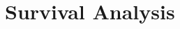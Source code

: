 \documentclass[8pt]{extarticle}
\begin{document}












\section{Survival Analysis}
\end{document}
